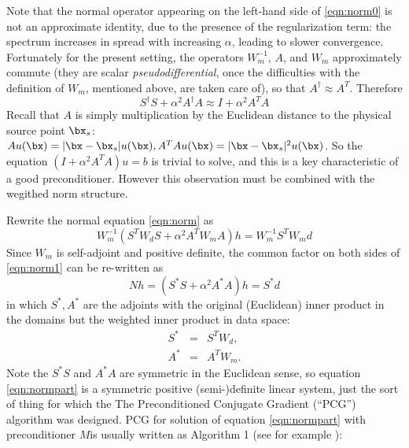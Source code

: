 Note that the normal operator appearing on the left-hand side of
\ref{eqn:norm0} is not an approximate identity, due to the presence of
the regularization term: the spectrum increases in spread with
increasing $\alpha$, leading to slower convergence. Fortunately for
the present setting, the operators $W_m^{-1}$, $A$, and $W_m$
approximately commute (they are scalar {\em pseudodifferential}, once
the difficulties with the definition of $W_m$, mentioned above, are
taken care of), so that $A^{\dagger} \approx A^T$. Therefore
\begin{equation}
  \label{eqn:normapprox}
  S^{\dagger}S + \alpha^2 A^{\dagger}A \approx I + \alpha^2A^TA
\end{equation}
Recall that $A$ is simply multiplication by the Euclidean distance to
the physical source point $\bx_s$: $A u (\bx) = |\bx-\bx_s|u(\bx),
A^TAu(\bx) = |\bx-\bx_s|^2u(\bx)$. So the equation $(I+\alpha^2
A^TA)u=b$ is trivial to solve, and this is a key characteristic of a
good preconditioner. However this observation must be combined with
the wegithed norm structure.

Rewrite the normal equation \ref{eqn:norm} as
\begin{equation}
  \label{eqn:norm1}
  W_m^{-1}(S^TW_dS + \alpha^2 A^TW_mA)h = W_m^{-1}S^TW_md 
\end{equation}
Since $W_m$ is self-adjoint and positive definite, the common factor on both sides of \ref{eqn:norm1} can be re-written as
\begin{equation}
  \label{eqn:normpart}
  Nh = (S^*S + \alpha^2 A^*A)h = S^*d 
\end{equation}
in which $S^*, A^*$ are the adjoints with the original (Euclidean)
inner product in the domains but the weighted inner product in data
space:
\begin{eqnarray}
  \label{eqn:sadj}
  S^* &=& S^T W_d,\\
  A^* &=& A^T W_m.
\end{eqnarray}
Note the $S^*S$ and $A^*A$ are symmetric in the Euclidean sense, so
equation \ref{eqn:normpart} is a symmetric positive (semi-)definite
linear system, just the sort of thing for which the 
The Preconditioned Conjugate Gradient (``PCG'') algorithm was
designed. PCG for solution
of equation \ref{eqn:normpart} with preconditioner $M$is usually
written as Algorithm 1 (see for example \cite{Golub:2012}):

